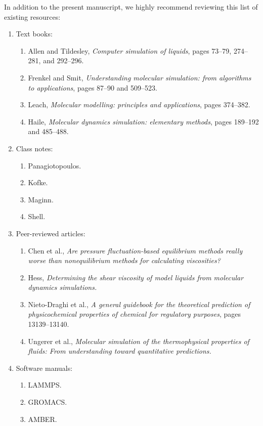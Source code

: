 \documentclass[9pt,bestpractices]{livecoms}
\begin{document}
In addition to the present manuscript, we highly recommend reviewing this list of existing resources:
\begin{enumerate}
	\item Text books:
	\begin{enumerate}
		\item Allen and Tildesley, \textit{Computer simulation of liquids}, pages 73--79, 274--281, and 292--296. \cite{Allen2017}
		\item Frenkel and Smit, \textit{Understanding molecular simulation: from algorithms to applications}, pages 87--90 and 509--523. \cite{Frenkel2002}
		\item Leach, \textit{Molecular modelling: principles and applications}, pages 374--382. \cite{Leach2001}
		\item Haile, \textit{Molecular dynamics simulation: elementary methods}, pages 189--192 and 485--488. \cite{Haile1992}
	\end{enumerate}
	\item Class notes:
	\begin{enumerate}
		\item Panagiotopoulos. \cite{PanaNotes}
		\item Kofke. \cite{KofkeNotes}
		\item Maginn. \cite{MaginnNotes}
		\item Shell. \cite{ShellNotes}
	\end{enumerate}
	\item Peer-reviewed articles:
	\begin{enumerate}
		\item Chen et al., \textit{Are pressure fluctuation-based equilibrium methods really worse than nonequilibrium methods for calculating viscosities?} \cite{Chen2009}
		\item Hess, \textit{Determining the shear viscosity of model liquids from molecular dynamics simulations.} \cite{Hess2002}
		\item Nieto-Draghi et al., \textit{A general guidebook for the theoretical prediction of physicochemical properties of chemical for regulatory purposes}, pages 13139--13140. \cite{Nieto2015}
		\item Ungerer et al., \textit{Molecular simulation of the thermophysical properties of fluids: From understanding toward quantitative predictions.} \cite{Ungerer2007}
	\end{enumerate}
	\item Software manuals:
	\begin{enumerate}
		\item LAMMPS. \cite{LAMMPS}
		\item GROMACS. \cite{GROMACS}
		\item AMBER. \cite{AMBER2018}
	\end{enumerate}
\end{enumerate}
\end{document}
